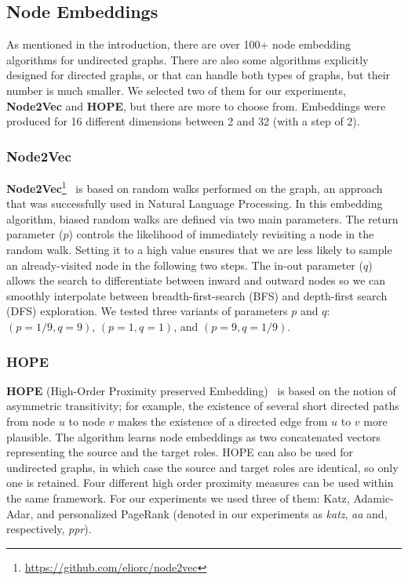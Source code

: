 \documentclass[11pt]{article}
\begin{document}
\subsection{Node Embeddings}\label{sec:experiments2}

As mentioned in the introduction, there are over 100+ node embedding algorithms for undirected graphs. 
There are also some algorithms explicitly designed for directed graphs, or that can handle both types of graphs, but their number is much smaller. 
We selected two of them for our experiments, \textbf{Node2Vec} and \textbf{HOPE}, but there are more to choose from. Embeddings were produced for 16 different dimensions between 2 and 32 (with a step of 2). 

\subsubsection{Node2Vec}

\textbf{Node2Vec}\footnote{\url{https://github.com/eliorc/node2vec}}~\cite{node2vec} is based on random walks performed on the graph, an approach that was successfully used in Natural Language Processing. In this embedding algorithm, biased random walks are defined via two main parameters.
The return parameter ($p$) controls the likelihood of immediately revisiting a node in the random walk. Setting it to a high value ensures that we are less likely to sample an already-visited node in the following two steps.
The in-out parameter ($q$) allows the search to differentiate between inward and outward nodes so we can smoothly interpolate between breadth-first-search (BFS) and depth-first search (DFS) exploration. 
We tested three variants of parameters $p$ and $q$: $(p=1/9,q=9)$, $(p=1,q=1)$, and $(p=9,q=1/9)$.

\subsubsection{HOPE}

\textbf{HOPE} (High-Order Proximity preserved Embedding)~\cite{Ou2016} is based on the notion of asymmetric transitivity; for example, the existence of several short directed paths from node $u$ to node $v$ makes the existence of a directed edge from $u$ to $v$ more plausible. The algorithm learns node embeddings as two concatenated vectors representing the source and the target roles. HOPE can also be used for undirected graphs, in which case the source and target roles are identical, so only one is retained. Four different high order proximity measures can be used within the same framework. For our experiments we used three of them: Katz, Adamic-Adar, and personalized PageRank (denoted in our experiments as \textit{katz}, \textit{aa} and, respectively, \textit{ppr}). 
\end{document}
